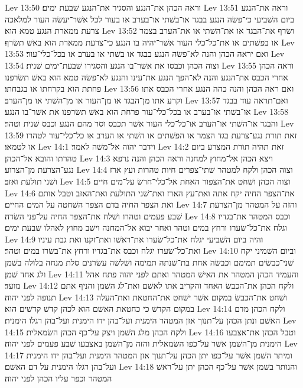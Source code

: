 Lev 13:50  וראה הכהן את־הנגע והסגיר את־הנגע שׁבעת ימים׃
Lev 13:51  וראה את־הנגע ביום השׁביעי כי־פשׂה הנגע בבגד או־בשׁתי או־בערב או בעור לכל אשׁר־יעשׂה העור למלאכה צרעת ממארת הנגע טמא הוא׃
Lev 13:52  ושׂרף את־הבגד או את־השׁתי או את־הערב בצמר או בפשׁתים או את־כל־כלי העור אשׁר־יהיה בו הנגע כי־צרעת ממארת הוא באשׁ תשׂרף׃
Lev 13:53  ואם יראה הכהן והנה לא־פשׂה הנגע בבגד או בשׁתי או בערב או בכל־כלי־עור׃
Lev 13:54  וצוה הכהן וכבסו את אשׁר־בו הנגע והסגירו שׁבעת־ימים שׁנית׃
Lev 13:55  וראה הכהן אחרי הכבס את־הנגע והנה לא־הפך הנגע את־עינו והנגע לא־פשׂה טמא הוא באשׁ תשׂרפנו פחתת הוא בקרחתו או בגבחתו׃
Lev 13:56  ואם ראה הכהן והנה כהה הנגע אחרי הכבס אתו וקרע אתו מן־הבגד או מן־העור או מן־השׁתי או מן־הערב׃
Lev 13:57  ואם־תראה עוד בבגד או־בשׁתי או־בערב או בכל־כלי־עור פרחת הוא באשׁ תשׂרפנו את אשׁר־בו הנגע׃
Lev 13:58  והבגד או־השׁתי או־הערב או־כל־כלי העור אשׁר תכבס וסר מהם הנגע וכבס שׁנית וטהר׃
Lev 13:59  זאת תורת נגע־צרעת בגד הצמר או הפשׁתים או השׁתי או הערב או כל־כלי־עור לטהרו או לטמאו׃
Lev 14:1  וידבר יהוה אל־משׁה לאמר׃
Lev 14:2  זאת תהיה תורת המצרע ביום טהרתו והובא אל־הכהן׃
Lev 14:3  ויצא הכהן אל־מחוץ למחנה וראה הכהן והנה נרפא נגע־הצרעת מן־הצרוע׃
Lev 14:4  וצוה הכהן ולקח למטהר שׁתי־צפרים חיות טהרות ועץ ארז ושׁני תולעת ואזב׃
Lev 14:5  וצוה הכהן ושׁחט את־הצפור האחת אל־כלי־חרשׂ על־מים חיים׃
Lev 14:6  את־הצפר החיה יקח אתה ואת־עץ הארז ואת־שׁני התולעת ואת־האזב וטבל אותם ואת הצפר החיה בדם הצפר השׁחטה על המים החיים׃
Lev 14:7  והזה על המטהר מן־הצרעת שׁבע פעמים וטהרו ושׁלח את־הצפר החיה על־פני השׂדה׃
Lev 14:8  וכבס המטהר את־בגדיו וגלח את־כל־שׂערו ורחץ במים וטהר ואחר יבוא אל־המחנה וישׁב מחוץ לאהלו שׁבעת ימים׃
Lev 14:9  והיה ביום השׁביעי יגלח את־כל־שׂערו את־ראשׁו ואת־זקנו ואת גבת עיניו ואת־כל־שׂערו יגלח וכבס את־בגדיו ורחץ את־בשׂרו במים וטהר׃
Lev 14:10  וביום השׁמיני יקח שׁני־כבשׂים תמימם וכבשׂה אחת בת־שׁנתה תמימה ושׁלשׁה עשׂרנים סלת מנחה בלולה בשׁמן ולג אחד שׁמן׃
Lev 14:11  והעמיד הכהן המטהר את האישׁ המטהר ואתם לפני יהוה פתח אהל מועד׃
Lev 14:12  ולקח הכהן את־הכבשׂ האחד והקריב אתו לאשׁם ואת־לג השׁמן והניף אתם תנופה לפני יהוה׃
Lev 14:13  ושׁחט את־הכבשׂ במקום אשׁר ישׁחט את־החטאת ואת־העלה במקום הקדשׁ כי כחטאת האשׁם הוא לכהן קדשׁ קדשׁים הוא׃
Lev 14:14  ולקח הכהן מדם האשׁם ונתן הכהן על־תנוך אזן המטהר הימנית ועל־בהן ידו הימנית ועל־בהן רגלו הימנית׃
Lev 14:15  ולקח הכהן מלג השׁמן ויצק על־כף הכהן השׂמאלית׃
Lev 14:16  וטבל הכהן את־אצבעו הימנית מן־השׁמן אשׁר על־כפו השׂמאלית והזה מן־השׁמן באצבעו שׁבע פעמים לפני יהוה׃
Lev 14:17  ומיתר השׁמן אשׁר על־כפו יתן הכהן על־תנוך אזן המטהר הימנית ועל־בהן ידו הימנית ועל־בהן רגלו הימנית על דם האשׁם׃
Lev 14:18  והנותר בשׁמן אשׁר על־כף הכהן יתן על־ראשׁ המטהר וכפר עליו הכהן לפני יהוה׃
